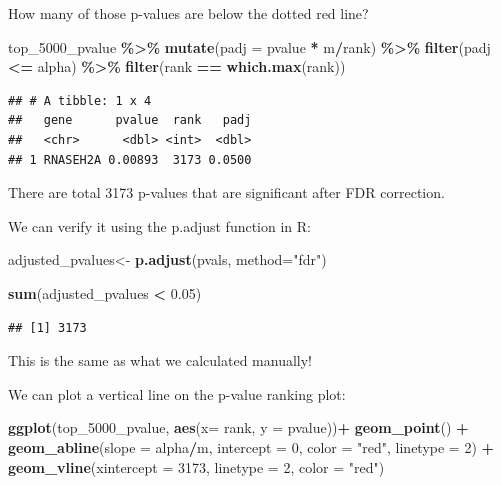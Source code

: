 \documentclass[
]{book}
\newenvironment{Shaded}{\begin{snugshade}}{\end{snugshade}}
\newcommand{\AttributeTok}[1]{\textcolor[rgb]{0.13,0.29,0.53}{#1}}
\newcommand{\DecValTok}[1]{\textcolor[rgb]{0.00,0.00,0.81}{#1}}
\newcommand{\FloatTok}[1]{\textcolor[rgb]{0.00,0.00,0.81}{#1}}
\newcommand{\FunctionTok}[1]{\textcolor[rgb]{0.13,0.29,0.53}{\textbf{#1}}}
\newcommand{\NormalTok}[1]{#1}
\newcommand{\OtherTok}[1]{\textcolor[rgb]{0.56,0.35,0.01}{#1}}
\newcommand{\SpecialCharTok}[1]{\textcolor[rgb]{0.81,0.36,0.00}{\textbf{#1}}}
\newcommand{\StringTok}[1]{\textcolor[rgb]{0.31,0.60,0.02}{#1}}
\begin{document}
How many of those p-values are below the dotted red line?

\begin{Shaded}
\begin{Highlighting}[]
\NormalTok{top\_5000\_pvalue }\SpecialCharTok{\%\textgreater{}\%}
  \FunctionTok{mutate}\NormalTok{(}\AttributeTok{padj =}\NormalTok{ pvalue }\SpecialCharTok{*}\NormalTok{ m}\SpecialCharTok{/}\NormalTok{rank) }\SpecialCharTok{\%\textgreater{}\%}
  \FunctionTok{filter}\NormalTok{(padj }\SpecialCharTok{\textless{}=}\NormalTok{ alpha) }\SpecialCharTok{\%\textgreater{}\%}
  \FunctionTok{filter}\NormalTok{(rank }\SpecialCharTok{==} \FunctionTok{which.max}\NormalTok{(rank))}
\end{Highlighting}
\end{Shaded}

\begin{verbatim}
## # A tibble: 1 x 4
##   gene      pvalue  rank   padj
##   <chr>      <dbl> <int>  <dbl>
## 1 RNASEH2A 0.00893  3173 0.0500
\end{verbatim}

There are total 3173 p-values that are significant after FDR correction.

We can verify it using the p.adjust function in R:

\begin{Shaded}
\begin{Highlighting}[]
\NormalTok{adjusted\_pvalues}\OtherTok{\textless{}{-}} \FunctionTok{p.adjust}\NormalTok{(pvals, }\AttributeTok{method=}\StringTok{"fdr"}\NormalTok{)}

\FunctionTok{sum}\NormalTok{(adjusted\_pvalues }\SpecialCharTok{\textless{}} \FloatTok{0.05}\NormalTok{)}
\end{Highlighting}
\end{Shaded}

\begin{verbatim}
## [1] 3173
\end{verbatim}

This is the same as what we calculated manually!

We can plot a vertical line on the p-value ranking plot:

\begin{Shaded}
\begin{Highlighting}[]
\FunctionTok{ggplot}\NormalTok{(top\_5000\_pvalue, }\FunctionTok{aes}\NormalTok{(}\AttributeTok{x=}\NormalTok{ rank, }\AttributeTok{y =}\NormalTok{ pvalue))}\SpecialCharTok{+}
  \FunctionTok{geom\_point}\NormalTok{() }\SpecialCharTok{+} 
  \FunctionTok{geom\_abline}\NormalTok{(}\AttributeTok{slope =}\NormalTok{ alpha}\SpecialCharTok{/}\NormalTok{m, }\AttributeTok{intercept =} \DecValTok{0}\NormalTok{, }\AttributeTok{color =} \StringTok{"red"}\NormalTok{, }\AttributeTok{linetype =} \DecValTok{2}\NormalTok{) }\SpecialCharTok{+}
  \FunctionTok{geom\_vline}\NormalTok{(}\AttributeTok{xintercept =} \DecValTok{3173}\NormalTok{, }\AttributeTok{linetype =} \DecValTok{2}\NormalTok{, }\AttributeTok{color =} \StringTok{"red"}\NormalTok{)}
\end{Highlighting}
\end{Shaded}
\end{document}
